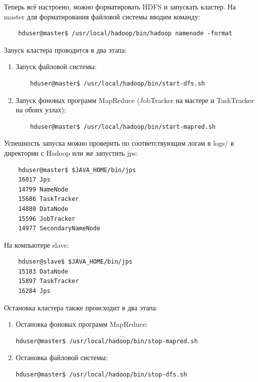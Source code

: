 \documentclass[12pt,a4paper]{extarticle} %
\begin{document}
\noindent Теперь всё настроено, можно форматировать HDFS и запускать кластер. На master для форматирования файловой  системы вводим команду:
\begin{lstlisting}
    hduser@master$ /usr/local/hadoop/bin/hadoop namenode -format
\end{lstlisting}

\newpage
\noindent Запуск кластера проводится в два этапа:
\begin{enumerate}
    \item Запуск файловой системы:
    \begin{lstlisting}
    hduser@master$ /usr/local/hadoop/bin/start-dfs.sh
    \end{lstlisting}
    \item Запуск фоновых программ MapReduce (JobTracker на мастере и TaskTracker на обоих узлах):
    \begin{lstlisting}
    hduser@master$ /usr/local/hadoop/bin/start-mapred.sh
    \end{lstlisting}
\end{enumerate}

\noindent Успешность запуска можно проверить по соответствующим логам в logs/ в директории  с Hadoop или же запустить jps:
\begin{lstlisting}
    hduser@master$ $JAVA_HOME/bin/jps
    16017 Jps
    14799 NameNode
    15686 TaskTracker
    14880 DataNode
    15596 JobTracker
    14977 SecondaryNameNode
\end{lstlisting}

\noindent На компьютере slave:
\begin{lstlisting}
    hduser@slave$ $JAVA_HOME/bin/jps
    15183 DataNode
    15897 TaskTracker
    16284 Jps
\end{lstlisting}

\noindent Остановка кластера также происходит в два этапа:
\begin{enumerate}
    \item Остановка фоновых программ MapReduce:
    \begin{lstlisting}[language=sh]
    hduser@master$ /usr/local/hadoop/bin/stop-mapred.sh
    \end{lstlisting}
    \item Остановка файловой системы:
    \begin{lstlisting}[language=sh]
    hduser@master$ /usr/local/hadoop/bin/stop-dfs.sh
    \end{lstlisting}
\end{enumerate}
\end{document}
